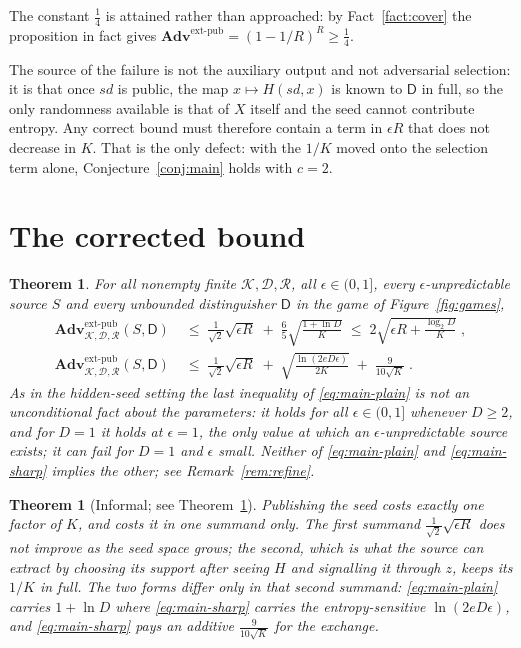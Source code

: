 \documentclass[11pt,a4paper]{article}
\theoremstyle{plain}
\newtheorem{theorem}{Theorem}
\newtheorem*{theoremstar}{Theorem}
\theoremstyle{definition}
\theoremstyle{remark}
\newcommand{\Adv}{\mathbf{Adv}}
\newcommand{\extp}{\mathrm{ext}\text{-}\mathrm{pub}}
\newcommand{\sd}{\mathit{sd}}
\newcommand{\calK}{\mathcal{K}}
\newcommand{\calD}{\mathcal{D}}
\newcommand{\calR}{\mathcal{R}}
\begin{document}
The constant $\tfrac14$ is attained rather than approached: by Fact~\ref{fact:cover} the
proposition in fact gives
$\Adv^{\extp} = (1-1/R)^{R} \ge \tfrac14$.

The source of the failure is not the auxiliary output and not adversarial selection: it is that
once $\sd$ is public, the map $x \mapsto H(\sd,x)$ is known to $\mathsf{D}$ in full, so the only
randomness available is that of $X$ itself and the seed cannot contribute entropy. Any correct
bound must therefore contain a term in $\epsilon R$ that does not decrease in $K$. That is the
only defect: with the $1/K$ moved onto the selection term alone, Conjecture~\ref{conj:main} holds
with $c = 2$.

\section{The corrected bound}\label{sec:corrected}

\begin{theorem}\label{thm:main}
For all nonempty finite $\calK, \calD, \calR$, all $\epsilon \in (0,1]$, every $\epsilon$-unpredictable
source $S$ and every unbounded distinguisher $\mathsf{D}$ in the game of Figure~\ref{fig:games},
\begin{align}
  \Adv^{\extp}_{\calK,\calD,\calR}(S,\mathsf{D})
  &\;\le\; \frac{1}{\sqrt{2}}\sqrt{\epsilon R}
        \;+\; \frac{6}{5}\sqrt{\frac{1 + \ln D}{K}}
  \;\le\; 2\sqrt{\epsilon R + \frac{\log_2 D}{K}} \; ,
  \label{eq:main-plain}\\[2pt]
  \Adv^{\extp}_{\calK,\calD,\calR}(S,\mathsf{D})
  &\;\le\; \frac{1}{\sqrt{2}}\sqrt{\epsilon R}
        \;+\; \sqrt{\frac{\ln(2eD\epsilon)}{2K}} \;+\; \frac{9}{10\sqrt{K}} \; .
  \label{eq:main-sharp}
\end{align}
As in the hidden-seed setting the last inequality of \eqref{eq:main-plain} is not an unconditional
fact about the parameters: it holds for all $\epsilon \in (0,1]$ whenever $D \ge 2$, and for
$D = 1$ it holds at $\epsilon = 1$, the only value at which an $\epsilon$-unpredictable source
exists; it can fail for $D = 1$ and $\epsilon$ small. Neither of
\eqref{eq:main-plain} and \eqref{eq:main-sharp} implies the other; see Remark~\ref{rem:refine}.
\end{theorem}

\begin{theoremstar}[Informal; see Theorem~\ref{thm:main}]
Publishing the seed costs exactly one factor of $K$, and costs it in one summand only. The first
summand $\tfrac{1}{\sqrt{2}}\sqrt{\epsilon R}$ does not improve as the seed space grows; the
second, which is what the source can extract by choosing its support after seeing $H$ and signalling
it through $z$, keeps its $1/K$ in full. The two forms differ only in that second summand:
\eqref{eq:main-plain} carries $1 + \ln D$ where \eqref{eq:main-sharp} carries the
entropy-sensitive $\ln(2eD\epsilon)$, and \eqref{eq:main-sharp} pays an additive
$\tfrac{9}{10\sqrt{K}}$ for the exchange.
\end{theoremstar}
\end{document}
